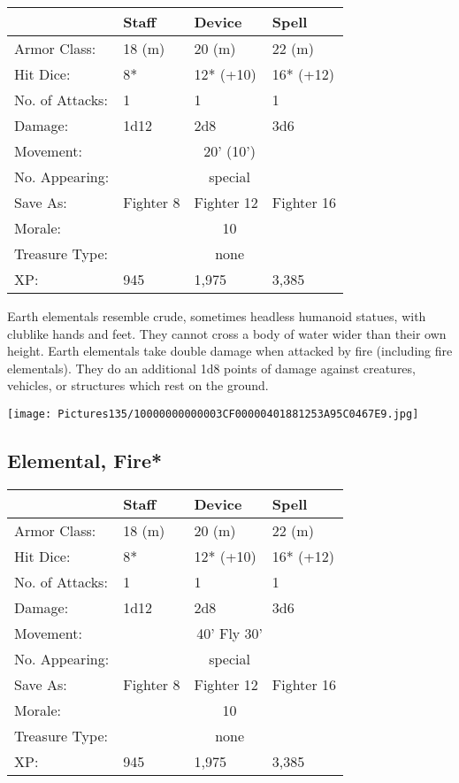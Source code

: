 \documentclass[a4paper,twoside,openany,10pt]{book}
\begin{document}
\begin{multicols}{2}
\begin{tabularx}{0.48\textwidth}{@{}lXXX@{}}
& Staff & Device & Spell \\\hline
Armor Class: & 18 (m) & 20 (m) & 22 (m) \\\hline
Hit Dice: & 8* & 12* (+10) & 16* (+12) \\\hline
No. of Attacks: & 1 & 1 & 1 \\\hline
Damage: & 1d12 & 2d8 & 3d6 \\\hline
Movement: & \multicolumn{3}{c}{20' (10')} \\\hline
No. Appearing: &\multicolumn{3}{c}{special} \\\hline
Save As: & Fighter 8 & Fighter 12 & Fighter 16 \\\hline
Morale: & \multicolumn{3}{c}{10} \\\hline
Treasure Type: & \multicolumn{3}{c}{none} \\\hline
XP: & 945 & 1,975 & 3,385 \\\hline
\end{tabularx}\medskip

Earth elementals resemble crude, sometimes headless humanoid statues, with clublike hands and feet. They cannot cross a body of water wider than their own height. Earth elementals take double damage when attacked by fire (including fire elementals). They do an additional 1d8 points of damage against creatures, vehicles, or structures which rest on the ground.

\begin{center}
	\texttt{[image: Pictures135/10000000000003CF00000401881253A95C0467E9.jpg]}
\end{center}

\columnbreak


\subsection*{Elemental, Fire*}\label{elemental-fire}
\begin{tabularx}{0.48\textwidth}{@{}lllX@{}}
& Staff & Device & Spell \\\hline
Armor Class: & 18 (m) & 20 (m) & 22 (m) \\\hline
Hit Dice: & 8* & 12* (+10) & 16* (+12) \\\hline
No. of Attacks: & 1 & 1 & 1 \\\hline
Damage: & 1d12 & 2d8 & 3d6 \\\hline
Movement:  & \multicolumn{3}{c}{40' Fly 30'}\\\hline
No. Appearing: &\multicolumn{3}{c}{special} \\\hline
Save As: & Fighter 8 & Fighter 12 & Fighter 16 \\\hline
Morale: & \multicolumn{3}{c}{10} \\\hline
Treasure Type: & \multicolumn{3}{c}{none} \\\hline
XP: & 945 & 1,975 & 3,385 \\\hline
\end{tabularx}\medskip


\end{multicols}
\end{document}
